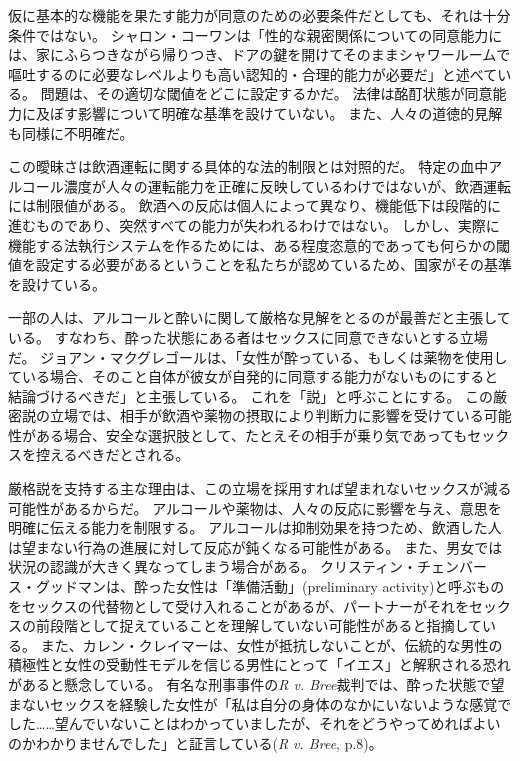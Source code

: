 \documentclass[paper=a4,book,openany]{jlreq}
\newcommand{\ig}[1]{}           %
\begin{document}
仮に基本的な機能を果たす能力が同意のための必要条件だとしても、それは十分条件ではない。
シャロン・コーワン\ig{Cowan}は「性的な親密関係についての同意能力には、家にふらつきながら帰りつき、ドアの鍵を開けてそのままシャワールームで嘔吐するのに必要なレベルよりも高い認知的・合理的能力が必要だ」と述べている\citep[p.919]{cowan08:_troub_drink}。
問題は、その適切な閾値をどこに設定するかだ。
法律は酩酊状態が同意能力に及ぼす影響について明確な基準を設けていない。
また、人々の道徳的見解も同様に不明確だ。

この曖昧さは飲酒運転に関する具体的な法的制限とは対照的だ。
特定の血中アルコール濃度が人々の運転能力を正確に反映しているわけではないが、飲酒運転には制限値がある。
飲酒への反応は個人によって異なり、機能低下は段階的に進むものであり、突然すべての能力が失われるわけではない。
しかし、実際に機能する法執行システムを作るためには、ある程度恣意的であっても何らかの閾値を設定する必要があるということを私たちが認めているため、国家がその基準を設けている。

一部の人は、アルコールと酔いに関して厳格な見解をとるのが最善だと主張している。
すなわち、酔った状態にある者はセックスに同意できないとする立場だ。
ジョアン・マクグレゴール\ig{Joan MacGregor}は、「女性が酔っている、もしくは薬物を使用している場合、そのこと自体が彼女が自発的に同意する能力がないものにすると結論づけるべきだ」と主張している\citep[pp.244--245]{macgregor94:_force_consen_reason_woman}。
これを「説」と呼ぶことにする。
この厳密説の立場では、相手が飲酒や薬物の摂取により判断力に影響を受けている可能性がある場合、安全な選択肢として、たとえその相手が乗り気であってもセックスを控えるべきだとされる。

厳格説を支持する主な理由は、この立場を採用すれば望まれないセックスが減る可能性があるからだ。
アルコールや薬物は、人々の反応に影響を与え、意思を明確に伝える能力を制限する\citep{koss89:_discr_analy_risk_factor_sexual}。
アルコールは抑制効果を持つため、飲酒した人は望まない行為の進展に対して反応が鈍くなる可能性がある。
また、男女では状況の認識が大きく異なってしまう場合がある。
クリスティン・チェンバース・グッドマン\ig{Christine Chambers Goodman}は、酔った女性は「準備活動」(preliminary activity)と呼ぶものをセックスの代替物として受け入れることがあるが、パートナーがそれをセックスの前段階として捉えていることを理解していない可能性があると指摘している\citep[p.79]{goodman09:_protec_party_girl}。
また、カレン・クレイマーは、女性が抵抗しないことが、伝統的な男性の積極性と女性の受動性モデルを信じる男性にとって「イエス」と解釈される恐れがあると懸念している\citep[p.121]{kramer94:_rule_myth}。
有名な刑事事件の\emph{R v. Bree}裁判では、酔った状態で望まないセックスを経験した女性が「私は自分の身体のなかにいないような感覚でした……望んでいないことはわかっていましたが、それをどうやってめればよいのかわかりませんでした」と証言している(\emph{R v. Bree}, p.8)。
\end{document}
